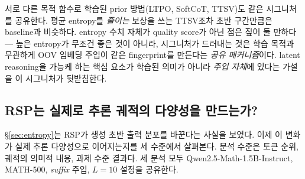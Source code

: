 서로 다른 목적 함수로 학습된 prior 방법(LTPO, SoftCoT, TTSV)도 같은 시그니처를 공유한다. 평균 entropy를 \emph{줄이는} 보상을 쓰는 TTSV조차 초반 구간만큼은 baseline과 비슷하다. entropy 수치 자체가 quality score가 아닌 점은 짚어 둘 만하다 --- 높은 entropy가 무조건 좋은 것이 아니라, 시그니처가 드러내는 것은 학습 목적과 무관하게 OOV 임베딩 주입이 같은 fingerprint를 만든다는 \emph{공유 메커니즘}이다. latent reasoning을 가능케 하는 핵심 요소가 학습된 의미가 아니라 \emph{주입 자체}에 있다는 가설을 이 시그니처가 뒷받침한다.

\subsection{RSP는 실제로 추론 궤적의 다양성을 만드는가?}\label{sec:diversity}

\S\ref{sec:entropy}는 RSP가 생성 초반 출력 분포를 바꾼다는 사실을 보였다. 이제 이 변화가 실제 추론 다양성으로 이어지는지를 세 수준에서 살펴본다. 분석 수준은 토큰 순위, 궤적의 의미적 내용, 과제 수준 결과다. 세 분석 모두 Qwen2.5-Math-1.5B-Instruct, MATH-500, \emph{suffix} 주입, $L=10$ 설정을 공유한다.

